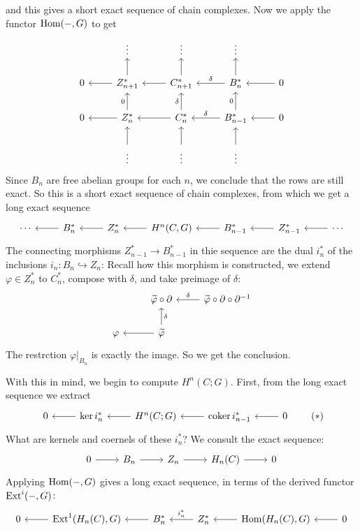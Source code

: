 and this gives a short exact sequence of chain complexes. Now we apply the functor $\mathrm{Hom}(-,G)$ to get
\[\begin{tikzcd}
&\vdots&\vdots&\vdots&\\
0&Z^*_{n+1}\ar[u]\ar[l]&C^*_{n+1}\ar[u]\ar[l]&B^*_{n}\ar[u]\ar[l,swap,"\delta"]&0\ar[l]\\
0&Z^*_{n}\ar[u,"0"]\ar[l]&C^*_n\ar[l]\ar[u,"\delta"]&B^*_{n-1}\ar[l,swap,"\delta"]\ar[u,"0"]&0\ar[l]\\
&\vdots\ar[u]&\vdots\ar[u]&\vdots\ar[u]&
\end{tikzcd}\]
Since $B_n$ are free abelian groups for each $n$, we conclude that the rows are still exact. So this is a short exact sequence of chain complexes, from which we get a long exact sequence
\[\begin{tikzcd}
\cdots&B_n^*\ar[l]&Z^*_{n}\ar[l]&H^n(C,G)\ar[l]&B_{n-1}^*\ar[l]&Z^*_{n-1}\ar[l]&\cdots\ar[l]
\end{tikzcd}\]
The connecting morphisms $Z^*_{n-1}\to B^*_{n-1}$ in thie sequence are the dual $i^*_n$ of the inclusions $i_n:B_n\hookrightarrow Z_n$: Recall how this morphism is constructed, we extend $\varphi\in Z^*_n$ to $C^*_n$, compose with $\delta$, and take preimage of $\delta$:
\[\begin{tikzcd}
&\widetilde{\varphi}\circ\partial&\widetilde{\varphi}\circ\partial\circ\partial^{-1}\ar[l,swap,"\delta"]\\
\varphi&\widetilde{\varphi}\ar[l]\ar[u,swap,"\delta"]&
\end{tikzcd}\]
The restrction $\varphi|_{B_n}$ is exactly the image. So we get the conclusion.\par
With this in mind, we begin to compute $H^n(C;G)$. First, from the long exact sequence we extract
\begin{equation}
\begin{tikzcd}
0&\ker i_n^*\ar[l]&H^n(C;G)\ar[l]&\coker i^*_{n-1}\ar[l]&0\ar[l]
\end{tikzcd}
\tag{$\ast$}
\end{equation}
What are kernels and coernels of these $i^*_n$? We consult the exact sequence:
\[\begin{tikzcd}
0\ar[r]&B_{n}\ar[r]&Z_n\ar[r]&H_n(C)\ar[r]&0
\end{tikzcd}\]
Applying $\mathrm{Hom}(-,G)$ gives a long exact sequence, in terms of the derived functor $\mathrm{Ext}^i(-,G)$:
\[\begin{tikzcd}
0&\Ext^1(H_n(C),G)\ar[l]&B^*_n\ar[l]&Z^*_n\ar[l,swap,"i^*_n"]&\Hom(H_n(C),G)\ar[l]&0\ar[l]
\end{tikzcd}\]
